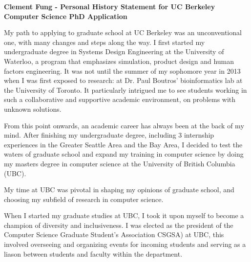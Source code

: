\documentclass[10pt]{article} %
\begin{document}
\begin{center}
{\Large \bf Clement Fung - Personal History Statement for UC Berkeley Computer Science PhD Application}
\end{center}

My path to applying to graduate school at UC Berkeley was an unconventional one, with many changes and steps along the way. I first started my undergraduate degree in Systems Design Engineering at the University of Waterloo, a program that emphasizes simulation, product design and human factors engineering. It was not until the summer of my sophomore year in 2013 when I was first exposed to research: at Dr. Paul Boutros' bioinformatics lab at the University of Toronto. It particularly intrigued me to see students working in such a collaborative and supportive academic environment, on problems with unknown solutions. 

From this point onwards, an academic career has always been at the back of my mind. After finishing my undergraduate degree, including 3 internship experiences in the Greater Seattle Area and the Bay Area, I decided to test the waters of graduate school and expand my training in computer science by doing my masters degree in computer science at the University of British Columbia (UBC).

My time at UBC was pivotal in shaping my opinions of graduate school, and choosing my subfield of research in computer science.

When I started my graduate studies at UBC, I took it upon myself to become a champion of diversity and inclusiveness. I was elected as the president of the Computer Science Graduate Student's Association CSGSA) at UBC, this involved overseeing and organizing events for incoming students and serving as a liason between students and faculty within the department.
\end{document}
